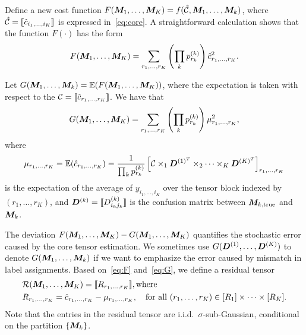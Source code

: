 \documentclass{article}
\begin{document}
\begin{appendices}
\begin{enumerate}
Define a new cost function $F(\bm M_1,\ldots,\bm M_K)= f(\hat {\mathcal{C}}, \bm M_1,\ldots,\bm M_k)$, where $\hat {\mathcal{C}}=\llbracket \hat c_{i_1,\ldots,i_K} \rrbracket$ is expressed in~\eqref{eq:core}. A straightforward calculation shows that the function $F(\cdot)$ has the form
\begin{equation}\label{eq:F}
F(\bm M_1,\ldots,\bm M_K) = \sum_{r_1,\ldots,r_K}\left(\prod_k p^{(k)}_{r_k}\right) \hat c_{r_1,\ldots,r_K}^2.
\end{equation}


Let $G(\bm M_1,\ldots,\bm M_k)=\mathbb{E}(F(\bm M_1,\ldots,\bm M_K))$, where the expectation is taken with respect to the $\mathcal{C}=\llbracket  \hat c_{r_1,\ldots,r_K} \rrbracket$. We have that  
\begin{equation}\label{eq:G}
G(\bm M_1,\ldots,\bm M_K)=\sum_{r_1,\ldots,r_K} \left(\prod_k p^{(k)}_{r_k}\right) \mu^2_{r_1,\ldots,r_K},
\end{equation}
where
\[
\mu_{r_1,\ldots,r_K}=\mathbb{E}(\hat c_{r_1,\ldots,r_K})={1\over \prod_k p^{(k)}_{r_k}}\left[ \mathcal{C}\times_1 \bm{D}^{(1)^T} \times_2\cdots\times_K \bm{D}^{(K)^T}\right]_{r_1,\ldots,r_K}
\]
is the expectation of the average of $y_{i_1,\ldots,i_K}$ over the tensor block indexed by $(r_1,\ldots,r_K)$, and $\bm{D}^{(k)}=\llbracket D^{(k)}_{i_kj_k} \rrbracket$ is the confusion matrix between $\bm M_{k,\text{true}}$ and $\bm M_k$.

The deviation $F(\bm M_1,\ldots,\bm M_K)-G(\bm M_1,\ldots,\bm M_K)$ quantifies the stochastic error caused by the core tensor estimation. We sometimes use $G(\bm{D}^{(1)},\ldots,\bm{D}^{(K)})$ to denote $G(\bm M_1,\ldots,\bm M_k)$ if we want to emphasize the error caused by mismatch in label assignments. 
Based on~\eqref{eq:F} and~\eqref{eq:G}, we define a residual tensor 
\begin{align}\label{eq:residual}
&\mathcal{R}(\bm M_1,\ldots,\bm M_K)=\llbracket R_{r_1,\ldots,r_K} \rrbracket,\text{where}\\
&R_{r_1,\ldots,r_K}= \hat c_{r_1,\ldots,r_K}-\mu_{r_1,\ldots,r_K} ,\quad \text{for all }(r_1,\ldots,r_K)\in[R_1]\times\cdots\times[R_K].
\end{align}
Note that the entries in the residual tensor are i.i.d.\ $\sigma$-sub-Gaussian, conditional on the partition $\{\bm M_k\}$.  



\end{enumerate}
\end{appendices}
\end{document}
